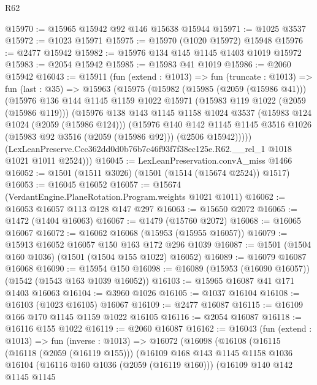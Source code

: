 \begin{lexlean}{R62}
\begin{coremodule}
@15970 := @15965 @15942 @92 @146 @15638 @15944
@15971 := @1025 @3537
@15972 := @1023 @15971
@15975 := @15970 (@1020 @15972) @15948
@15976 := @2477 @15942
@15982 := @15976 @134 @145 @1145 @1403 @1019 @15972
@15983 := @2054 @15942
@15985 := @15983 @41 @1019
@15986 := @2060 @15942
@16043 := @15911
    (fun (extend : @1013) =>
    fun (truncate : @1013) =>
    fun (last : @35) =>
    @15963
      (@15975
        (@15982
          (@15985 (@2059 (@15986 @41)))
          (@15976
            @136
            @144
            @1145
            @1159
            @1022
            @15971
            (@15983 @119 @1022 (@2059 (@15986 @119)))
            (@15976
              @138
              @143
              @1145
              @1158
              @1024
              @3537
              (@15983 @124 @1024 (@2059 (@15986 @124)))
              (@15976
                @140
                @142
                @1145
                @1145
                @3516
                @1026
                (@15983 @92 @3516 (@2059 (@15986 @92)))
                (@2506 @15942)))))
        (LexLeanPreserve.Ccc362dd0d0b76b7c46f93f7f38ec125e.R62.__rel_1 @1018 @1021 @1011 @2524)))
@16045 := LexLeanPreservation.convA_miss @1466
@16052 := @1501 (@1511 @3026) (@1501 (@1514 (@15674 @2524)) @1517)
@16053 := @16045 @16052
@16057 := @15674 (VerdantEngine.PlaneRotation.Program.weights @1021 @1011)
@16062 := @16053 @16057 @113 @128 @147 @297
@16063 := @15650 @2072
@16065 := @1472 (@1404 @16063)
@16067 := @1479 (@15760 @2072)
@16068 := @16065 @16067
@16072 := @16062 @16068 (@15953 (@15955 @16057))
@16079 := @15913 @16052 @16057 @150 @163 @172 @296 @1039
@16087 := @1501 (@1504 @160 @1036) (@1501 (@1504 @155 @1022) @16052)
@16089 := @16079 @16087 @16068
@16090 := @15954 @150
@16098 := @16089 (@15953 (@16090 @16057)) (@1542 (@1543 @163 @1039 @16052))
@16103 := @15965 @16087 @41 @171 @1403 @16063
@16104 := @3960 @1026
@16105 := @1037 @16104
@16108 := @16103 (@1023 @16105) @16067
@16109 := @2477 @16087
@16115 := @16109 @166 @170 @1145 @1159 @1022 @16105
@16116 := @2054 @16087
@16118 := @16116 @155 @1022
@16119 := @2060 @16087
@16162 := @16043
    (fun (extend : @1013) =>
    fun (inverse : @1013) =>
    @16072
      (@16098
        (@16108
          (@16115
            (@16118 (@2059 (@16119 @155)))
            (@16109
              @168
              @143
              @1145
              @1158
              @1036
              @16104
              (@16116 @160 @1036 (@2059 (@16119 @160)))
              (@16109
                @140
                @142
                @1145
                @1145

\end{coremodule}
\end{lexlean}
